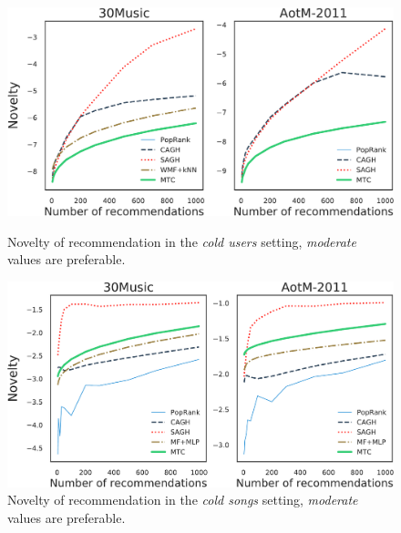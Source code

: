 \begin{figure}[!h]
    \centering
    \begin{minipage}{0.45\textwidth}
        \centering
        \includegraphics[width=\columnwidth]{fig/nov4.pdf}
        \caption{Novelty of recommendation in the \emph{cold users} setting, \emph{moderate} values are preferable.}
        \label{fig:nov4}
    \end{minipage}\hspace{15pt}
    \begin{minipage}{0.45\textwidth}
        \centering
        \includegraphics[width=\columnwidth]{fig/nov1.pdf}
        \caption{Novelty of recommendation in the \emph{cold songs} setting, \emph{moderate} values are preferable.}
        \label{fig:nov1}
    \end{minipage}
\end{figure}


\clearpage
\newpage
\onecolumn


